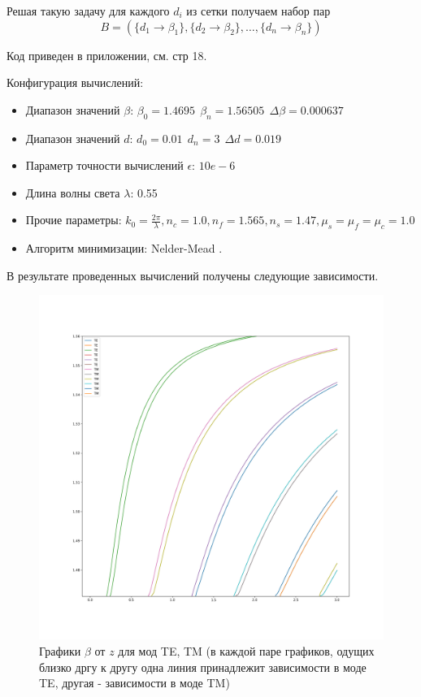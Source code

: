\documentclass{article}
\begin{document}
Решая такую задачу для каждого $d_i$ из сетки получаем набор пар $$B = \left( \{d_1 \to \beta_1\}, \{d_2 \to \beta_2\}, \ldots, \{d_n \to \beta_n\}  \right )$$

Код приведен в приложении, см. стр 18.

Конфигурация вычислений:
\begin{itemize}
    \item Диапазон значений $\beta$: $\beta_0 = 1.4695 ~~ \beta_n = 1.56505 ~~ \Delta \beta = 0.000637$
    \item Диапазон значений $d$: $d_0 = 0.01 ~~ d_n = 3 ~~ \Delta d = 0.019$
    \item Параметр точности вычислений $\epsilon$: $10e-6$
    \item Длина волны света $\lambda$: 0.55
    \item Прочие параметры: $k_0 = \frac{2\pi}{\lambda}, n_c = 1.0, n_f = 1.565, n_s = 1.47, \mu_s = \mu_f = \mu_c = 1.0$
    \item Алгоритм минимизации: Nelder-Mead \cite{nelder1965simplex}.
\end{itemize}

В результате проведенных вычислений получены следующие зависимости.

\begin{figure}[H]
    \centering
    \includegraphics[width=\linewidth]{final.png}
    \caption{Графики $\beta$ от $z$ для мод TE, TM (в каждой паре графиков, одущих близко дргу к другу одна линия принадлежит зависимости в моде TE, другая - зависимости в моде TM)}
    \label{beta_d}
\end{figure}
\end{document}
